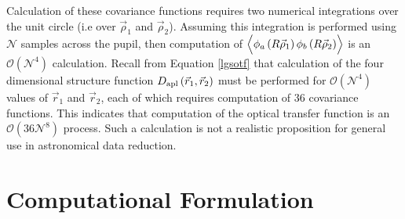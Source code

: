 Calculation of these covariance functions requires two numerical
integrations over the unit circle (i.e over $\vec{\rho}_{1}$
and $\vec{\rho}_{2}$).  Assuming this integration is performed
using $\mathcal{N}$ samples across the pupil, then computation of
$\left\langle \vphantom{\hat{\phi}_{a}}
\phi_{a}\left(R\vec{\rho}_{1}\right)
\phi_{b}\left(R\vec{\rho}_{2}\right)\right\rangle$ is an
$\mathcal{O}(\mathcal{N}^{4})$ calculation.  Recall from Equation
\ref{lgsotf} that calculation of the four dimensional structure
function $D_{\rm apl}\left(\vec{r}_{1},
\vec{r}_{2}\right)$ must be performed for
$\mathcal{O}(\mathcal{N}^{4})$ values of $\vec{r}_{1}$ and
$\vec{r}_{2}$, each of which requires computation of 36
covariance functions.  This indicates that computation of the optical
transfer function is an $\mathcal{O}(36\mathcal{N}^{8})$ process.
Such a calculation is not a realistic proposition for general use in
astronomical data reduction.

\section{Computational Formulation}
\label{sec:compcovariance}

